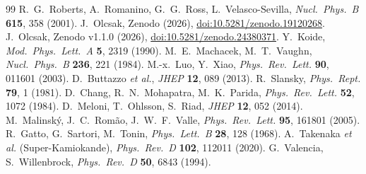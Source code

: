 \documentclass[11pt,a4paper]{article}
\begin{document}
\begin{thebibliography}{99}
 R.~G.~Roberts, A.~Romanino, G.~G.~Ross, L.~Velasco-Sevilla, \emph{Nucl.\ Phys.\ B} \textbf{615}, 358 (2001).
 J.~Olcsak, Zenodo (2026), \href{https://doi.org/10.5281/zenodo.19120268}{doi:10.5281/zenodo.19120268}.
 J.~Olcsak, Zenodo v1.1.0 (2026), \href{https://doi.org/10.5281/zenodo.24380371}{doi:10.5281/zenodo.24380371}.
 Y.~Koide, \emph{Mod.\ Phys.\ Lett.\ A} \textbf{5}, 2319 (1990).
 M.~E.~Machacek, M.~T.~Vaughn, \emph{Nucl.\ Phys.\ B} \textbf{236}, 221 (1984).
 M.-x.~Luo, Y.~Xiao, \emph{Phys.\ Rev.\ Lett.} \textbf{90}, 011601 (2003).
 D.~Buttazzo \textit{et al.}, \emph{JHEP} \textbf{12}, 089 (2013).
 R.~Slansky, \emph{Phys.\ Rept.} \textbf{79}, 1 (1981).
 D.~Chang, R.~N.~Mohapatra, M.~K.~Parida, \emph{Phys.\ Rev.\ Lett.} \textbf{52}, 1072 (1984).
 D.~Meloni, T.~Ohlsson, S.~Riad, \emph{JHEP} \textbf{12}, 052 (2014).
 M.~Malinský, J.~C.~Romão, J.~W.~F.~Valle, \emph{Phys.\ Rev.\ Lett.} \textbf{95}, 161801 (2005).
 R.~Gatto, G.~Sartori, M.~Tonin, \emph{Phys.\ Lett.\ B} \textbf{28}, 128 (1968).
 A.~Takenaka \textit{et al.} (Super-Kamiokande), \emph{Phys.\ Rev.\ D} \textbf{102}, 112011 (2020).
 G.~Valencia, S.~Willenbrock, \emph{Phys.\ Rev.\ D} \textbf{50}, 6843 (1994).
\end{thebibliography}
\end{document}
